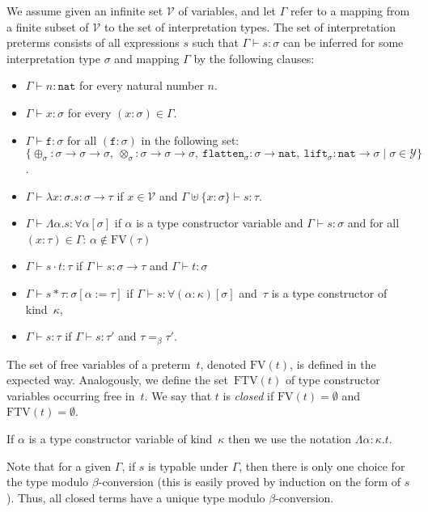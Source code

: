\documentclass[runningheads,a4paper]{llncs}
\newcommand{\Vars}{\mathcal{V}}
\newcommand{\ITypes}{\mathcal{Y}}
\newcommand{\quant}[2]{\forall #1[#2]}
\newcommand{\arrtype}{\rightarrow}
\newcommand{\abs}[2]{\lambda #1.#2}
\newcommand{\tabs}[2]{\Lambda #1.#2}
\newcommand{\app}[2]{#1 \cdot #2}
\newcommand{\tapp}[2]{#1 * #2}
\newcommand{\subst}[2]{#1:=#2}
\newcommand{\FTV}{\mathrm{FTV}}
\newcommand{\FV}{\mathrm{FV}}
\newcommand{\nat}{\mathtt{nat}}
\newcommand{\flatten}{\mathtt{flatten}}
\newcommand{\lift}{\mathtt{lift}}
\begin{document}
\begin{definition}\label{def_typing}\normalfont
We assume given an infinite set $\Vars$ of variables, and let $\Gamma$
refer to a mapping from a finite subset of $\Vars$ to the set of
interpretation types. The set of interpretation preterms consists of
all expressions $s$ such that $\Gamma \vdash s : \sigma$ can be
inferred for some interpretation type $\sigma$ and mapping $\Gamma$ by
the following clauses:
\begin{itemize}
\item $\Gamma \vdash n : \nat$ for every natural number $n$.
\item $\Gamma \vdash x : \sigma$ for every $(x : \sigma) \in \Gamma$.
\item $\Gamma \vdash \mathtt{f} : \sigma$ for all $(\mathtt{f} :
  \sigma)$ in the following set: $\{ \oplus_\sigma : \sigma \arrtype
  \sigma \arrtype \sigma,\ \otimes_\sigma : \sigma \arrtype \sigma
  \arrtype \sigma,\ \flatten_{\sigma} : \sigma \arrtype
  \nat,\ \lift_{\sigma} : \nat \arrtype \sigma \mid \sigma \in \ITypes
  \}$.
\item $\Gamma \vdash \abs{x:\sigma}{s} : \sigma \arrtype \tau$ if $x
  \in \Vars$ and $\Gamma \uplus \{ x : \sigma \} \vdash s : \tau$.
\item $\Gamma \vdash \tabs{\alpha}{s} : \quant{\alpha}{\sigma}$ if
  $\alpha$ is a type constructor variable and $\Gamma \vdash s :
  \sigma$ and for all $(x : \tau) \in \Gamma$: $\alpha \notin
  \FV(\tau)$
\item $\Gamma \vdash \app{s}{t} : \tau$ if $\Gamma \vdash s : \sigma
  \arrtype \tau$ and $\Gamma \vdash t : \sigma$
\item $\Gamma \vdash \tapp{s}{\tau} : \sigma[\subst{\alpha}{\tau}]$ if
  $\Gamma \vdash s : \quant{(\alpha:\kappa)}{\sigma}$ and~$\tau$ is a
  type constructor of kind~$\kappa$,
\item $\Gamma \vdash s : \tau$ if $\Gamma \vdash s : \tau'$ and $\tau
  =_\beta \tau'$.
\end{itemize}
The set of free variables of a preterm~$t$, denoted $\FV(t)$, is
defined in the expected way. Analogously, we define the set~$\FTV(t)$
of type constructor variables occurring free in~$t$. We say that $t$
is \emph{closed} if $\FV(t) = \emptyset$ and $\FTV(t) = \emptyset$.
\end{definition}

If $\alpha$ is a type constructor variable of kind~$\kappa$ then we
use the notation $\tabs{\alpha:\kappa}{t}$.

Note that for a given $\Gamma$, if $s$ is typable under $\Gamma$, then
there is only one choice for the type modulo $\beta$-conversion (this
is easily proved by induction on the form of $s$). Thus, all closed
terms have a unique type modulo $\beta$-conversion.
\end{document}
